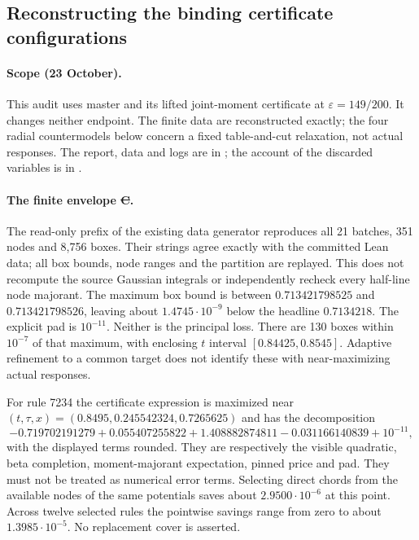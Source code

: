 \subsection{Reconstructing the binding certificate configurations}
\label{sec:binding-audit-20261023}
\paragraph{Scope (23 October).}
This audit uses master  and its lifted joint-moment
certificate at $\varepsilon=149/200$. It changes neither endpoint.
The finite data are reconstructed exactly; the four radial countermodels
below concern a fixed table-and-cut relaxation, not actual responses.
The report, data and logs are in
;
the account of the discarded variables is in
.

\paragraph{The finite envelope \st{C}.}
The read-only prefix of the existing data generator reproduces all
21 batches, 351 nodes and 8,756 boxes. Their strings agree exactly with
the committed Lean data; all box bounds, node ranges and the partition
are replayed. This does not recompute the source Gaussian integrals or
independently recheck every half-line node majorant.
The maximum box bound is between $0.713421798525$ and $0.713421798526$,
leaving about $1.4745\cdot10^{-9}$ below the headline $0.7134218$.
The explicit pad is $10^{-11}$. Neither is the principal loss.
There are 130 boxes within $10^{-7}$ of that maximum, with enclosing
$t$ interval $[0.84425,0.8545]$. Adaptive refinement to a common target
does not identify these with near-maximizing actual responses.

For rule 7234 the certificate expression is maximized near
$(t,\tau,x)=(0.8495,0.245542324,0.7265625)$ and has the decomposition
\[
 -0.719702191279+0.055407255822+1.408882874811
       -0.031166140839+10^{-11},
\]
with the displayed terms rounded. They are respectively the visible
quadratic, beta completion, moment-majorant expectation, pinned price
and pad. They must not be treated as numerical error terms.
Selecting direct chords from the available nodes of the same potentials
saves about $2.9500\cdot10^{-6}$ at this point. Across twelve selected
rules the pointwise savings range from zero to about
$1.3985\cdot10^{-5}$. No replacement cover is asserted.

